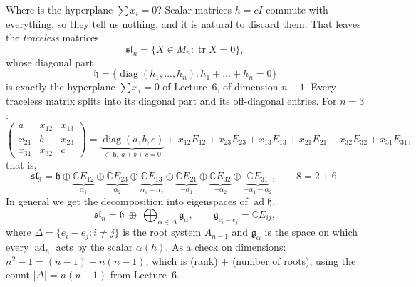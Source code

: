 \documentclass[11pt,openany]{book}
\theoremstyle{plain}
\theoremstyle{definition}
\theoremstyle{remark}
\newcommand{\C}{\mathbb{C}}
\newcommand{\abs}[1]{\left\lvert #1 \right\rvert}
\begin{document}
Where is the hyperplane $\sum x_i=0$? Scalar matrices $h=cI$ commute with everything, so they tell us
nothing, and it is natural to discard them. That leaves the \emph{traceless} matrices
\[
  \mathfrak{sl}_n=\{X\in M_n:\operatorname{tr}X=0\},
\]
whose diagonal part
\[
  \mathfrak h=\{\operatorname{diag}(h_1,\dots,h_n): h_1+\dots+h_n=0\}
\]
is exactly the hyperplane $\sum x_i=0$ of Lecture~6, of dimension $n-1$. Every traceless matrix splits
into its diagonal part and its off-diagonal entries. For $n=3$:
\[
  \begin{pmatrix}a&x_{12}&x_{13}\\x_{21}&b&x_{23}\\x_{31}&x_{32}&c\end{pmatrix}
  =\underbrace{\operatorname{diag}(a,b,c)}_{\in\,\mathfrak h,\ a+b+c=0}
  +\,x_{12}E_{12}+x_{23}E_{23}+x_{13}E_{13}+x_{21}E_{21}+x_{32}E_{32}+x_{31}E_{31},
\]
that is,
\[
  \mathfrak{sl}_3=\mathfrak h\oplus\underbrace{\C E_{12}}_{\alpha_1}\oplus\underbrace{\C E_{23}}_{\alpha_2}
  \oplus\underbrace{\C E_{13}}_{\alpha_1+\alpha_2}\oplus\underbrace{\C E_{21}}_{-\alpha_1}
  \oplus\underbrace{\C E_{32}}_{-\alpha_2}\oplus\underbrace{\C E_{31}}_{-\alpha_1-\alpha_2},
  \qquad 8=2+6.
\]
In general we get the decomposition into eigenspaces of $\operatorname{ad}\mathfrak h$,
\begin{equation}\label{LIE:eq:rootdecomp}
  \mathfrak{sl}_n=\mathfrak h\ \oplus\ \bigoplus_{\alpha\in\Delta}\mathfrak g_\alpha,
  \qquad
  \mathfrak g_{e_i-e_j}=\C E_{ij},
\end{equation}
where $\Delta=\{e_i-e_j: i\neq j\}$ is the root system $A_{n-1}$ and $\mathfrak g_\alpha$ is the space on
which every $\operatorname{ad}_h$ acts by the scalar $\alpha(h)$. As a check on dimensions:
$n^2-1=(n-1)+n(n-1)$, which is (rank) $+$ (number of roots), using the count
$\abs{\Delta}=n(n-1)$ from Lecture~6.
\end{document}
